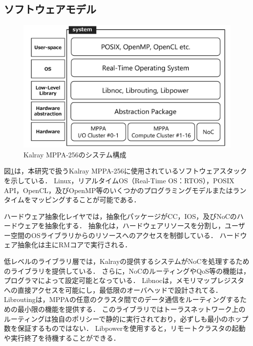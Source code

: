 \documentclass[submit,techrep]{ipsj_v2/UTF8/ipsj}
\begin{document}
\subsection{ソフトウェアモデル}
\label{sec:software_model}

\begin{figure}[t]
  \centering
  \includegraphics[width=0.8\linewidth]{../figure/softwarestack.pdf}
  \caption{\label{fig:software_stack}
    Kalray MPPA-256のシステム構成}
\end{figure}

図\ref{fig:software_stack}は，本研究で扱うKalray MPPA-256に使用されているソフトウェアスタックを示している．
Linux，リアルタイムOS（Real-Time OS：RTOS），POSIX API，OpenCL，及びOpenMP等のいくつかのプログラミングモデルまたはランタイムをマッピングすることが可能である．

ハードウェア抽象化レイヤでは，抽象化パッケージがCC，IOS，及びNoCのハードウェアを抽象化する．
抽象化は，ハードウェアリソースを分割し，ユーザー空間のOSライブラリからのリソースへのアクセスを制御している．
ハードウェア抽象化は主にRMコアで実行される．

低レベルのライブラリ層では，Kalrayの提供するシステムがNoCを処理するためのライブラリを提供している．
さらに，NoCのルーティングやQoS等の機能は，プログラマによって設定可能となっている．
Libnocは，メモリマップレジスタへの直接アクセスを可能にし，最低限のオーバヘッドで設計されてる．
Libroutingは，MPPAの任意のクラスタ間でのデータ通信をルーティングするための最小限の機能を提供する．
このライブラリではトーラスネットワーク上のルーティングは独自のポリシーで静的に実行されており，必ずしも最小のホップ数を保証するものではない．
Libpowerを使用すると，リモートクラスタの起動や実行終了を待機することができる．
\end{document}
